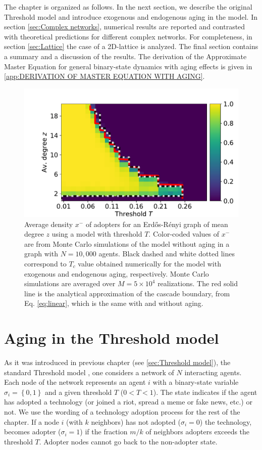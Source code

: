 The chapter is organized as follows. In the next section, we describe the original Threshold model and introduce exogenous and endogenous aging in the model. In section \ref{sec:Complex networks}, numerical results are reported and contrasted with theoretical predictions for different complex networks. For completeness, in section \ref{sec:Lattice} the case of a 2D-lattice is analyzed. The final section contains a summary and a discussion of the results. The derivation of the Approximate Master Equation for general binary-state dynamics with aging effects is given in \ref{app:DERIVATION OF MASTER EQUATION WITH AGING}.
\begin{figure}[bh!]
    \centering \captionsetup{font=sf}
    \includegraphics[width=0.65\columnwidth]{Figs/Aging_Threshold/cascade.pdf}
    \caption[Average density $x^{-}$ of adopters for an Erd\H{o}s-R\'enyi graph]{\label{fig:umbral} Average density $x^{-}$ of adopters for an Erd\H{o}s-R\'enyi graph of mean degree $z$ using a model with threshold $T$. Color-coded values of $x^{-}$ are from Monte Carlo simulations of the model without aging in a graph with $N = 10,000$ agents.  Black dashed and white dotted lines correspond to $T_c$ value obtained numerically for the model with exogenous and endogenous aging, respectively.  Monte Carlo simulations are averaged over $M = 5 \times 10^4$ realizations. The red solid line is the analytical approximation of the cascade boundary, from Eq. \eqref{eq:linear}, which is the same with and without aging.}
\end{figure}

\section{\label{sec:Threshold model with aging} Aging in the Threshold model}

As it was introduced in previous chapter (see \ref{sec:Threshold model}), the standard Threshold model \cite{granovetter-1978,watts-2002}, one considers a network of $N$ interacting agents. Each node of the network represents an agent $i$ with a binary-state variable $\sigma_i = \left\{ 0,1 \right\}$  and a given threshold $T$ ($0<T<1$). The state indicates if the agent has adopted a technology (or joined a riot, spread a meme or fake news, etc.) or not. We use the wording of a technology adoption process for the rest of the chapter. If a node $i$ (with $k$ neighbors) has not adopted  ($\sigma_i = 0$) the technology, becomes adopter ($\sigma_i = 1$) if the fraction $m / k$ of neighbors adopters exceeds the threshold $T$. Adopter nodes cannot go back to the non-adopter state.

